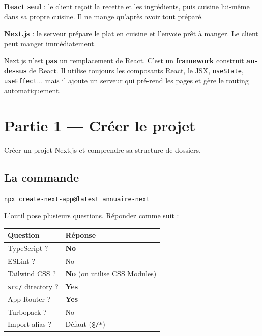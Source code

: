 \documentclass[11pt,a4paper]{article}
\begin{document}
\begin{infobox}
\textbf{React seul} : le client reçoit la recette et les ingrédients, puis cuisine lui-même dans sa propre cuisine. Il ne mange qu'après avoir tout préparé.

\textbf{Next.js} : le serveur prépare le plat en cuisine et l'envoie prêt à manger. Le client peut manger immédiatement.
\end{infobox}

\begin{retenirbox}[Next.js = React + un serveur]
Next.js n'est \textbf{pas} un remplacement de React. C'est un \textbf{framework} construit \textbf{au-dessus} de React. Il utilise toujours les composants React, le JSX, \texttt{useState}, \texttt{useEffect}... mais il ajoute un serveur qui pré-rend les pages et gère le routing automatiquement.
\end{retenirbox}

\section{Partie 1 --- Créer le projet}

\begin{objectifbox}
Créer un projet Next.js et comprendre sa structure de dossiers.
\end{objectifbox}

\subsection{La commande}

\begin{lstlisting}[style=terminal]
npx create-next-app@latest annuaire-next
\end{lstlisting}

L'outil pose plusieurs questions. Répondez comme suit :

\begin{center}
\begin{tabular}{lp{6cm}}
\toprule
\textbf{Question} & \textbf{Réponse} \\
\midrule
TypeScript ? & \textbf{No} \\
ESLint ? & No \\
Tailwind CSS ? & \textbf{No} (on utilise CSS Modules) \\
\texttt{src/} directory ? & \textbf{Yes} \\
App Router ? & \textbf{Yes} \\
Turbopack ? & No \\
Import alias ? & Défaut (\texttt{@/*}) \\
\bottomrule
\end{tabular}
\end{center}
\end{document}

